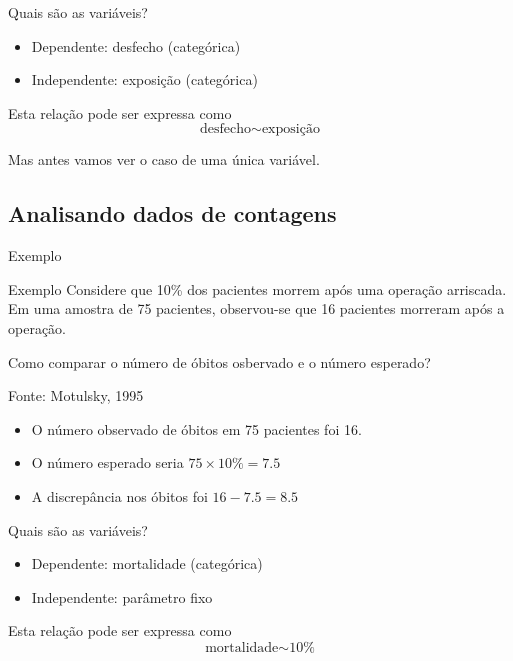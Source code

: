 \documentclass{beamer}
\begin{document}
\begin{frame}{Quais são as variáveis?}
  \begin{itemize}
    \small
  \item Dependente: desfecho (categórica)
  \item Independente: exposição (categórica)
  \end{itemize}
  \vfill
  \begin{block}{Esta relação pode ser expressa como}
    \begin{displaymath}
      \text{desfecho} \sim \text{exposição}
    \end{displaymath}
  \end{block}
\end{frame}

\begin{frame}{}
  \begin{center}
    Mas antes vamos ver o caso de uma única variável.
  \end{center}
\end{frame}

\subsection{Analisando dados de contagens}

\begin{frame}{Exemplo}
  \begin{exampleblock}{Exemplo}
    Considere que 10\% dos pacientes morrem após uma operação
    arriscada. Em uma amostra de 75 pacientes, observou-se que 16
    pacientes morreram após a operação.

    Como comparar o número de óbitos osbervado e o número esperado?

    Fonte: Motulsky, 1995
  \end{exampleblock}
  \begin{itemize}
  \item O número observado de óbitos em 75 pacientes foi 16.
  \item O número esperado seria $75 \times 10\% = 7.5$
  \item A discrepância nos óbitos foi $16-7.5 = 8.5$
  \end{itemize}
\end{frame}

\begin{frame}{Quais são as variáveis?}
  \begin{itemize}
    \small
  \item Dependente: mortalidade (categórica)
  \item Independente: parâmetro fixo
  \end{itemize}
  \vfill
  \begin{block}{Esta relação pode ser expressa como}
    \begin{displaymath}
      \text{mortalidade} \sim \text{10\%}
    \end{displaymath}
  \end{block}
\end{frame}
\end{document}
